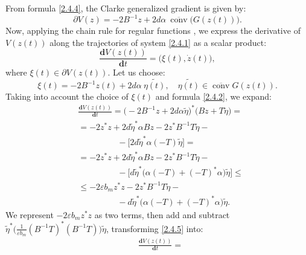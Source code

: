 \documentclass[journal]{IEEEtran}
\theoremstyle{myplain}
\begin{document}
\begin{IEEEproof}
From formula \eqref{2.4.4}, the Clarke generalized gradient \cite{p14} is given by:
\[
\partial V(z) = -2B^{-1}z + 2d\alpha~\overline{\operatorname{conv}}\big(G(z(t))\big).
\]
Now, applying the chain rule for regular functions \cite{ShevitzPaden1994}, we express the derivative of $V(z(t))$ along the trajectories of system \eqref{2.4.1} as a scalar product:
\[
\frac{\mathbf{d}V(z(t))}{\mathbf{d}t} = \big( \xi(t), \dot z(t) \big), \tag{a.e.}
\]
where $\xi(t) \in \partial V(z(t))$. Let us choose:
\[
\xi(t) = -2B^{-1}z(t)+2d\alpha~\widetilde{\eta(t)}, \quad \widetilde{\eta(t)} \in \overline{\operatorname{conv}}G(z(t)).
\]
Taking into account the choice of $\xi (t)$ and formula \eqref{2.4.2}, we expand:
\begin{equation}\label{2.4.5}
\begin{aligned} & \frac{\mathbf{d}V(z(t))}{\mathbf{d}t} = \big(-2B^{-1}z+2d\alpha \widetilde{\eta}\big)^{*}\big(Bz+T\widetilde{\eta}) =\\ 
& = -2z^{*}z+2d\widetilde{\eta}^{*}\alpha B z -  2z^{*}B^{-1}T\widetilde{\eta} - \\
&~~~~~~~~~~~~~~~~~~~~~- \big[2d \widetilde{\eta}^{*} \alpha (-T) \widetilde{\eta} \big]= \\
& = -2z^{*}z+2d\widetilde{\eta}^{*}\alpha B z - 2z^{*}B^{-1}T\widetilde{\eta} - \\
& ~~~~~~~~~~~~~~~~~~~~~- \big[ d \widetilde{\eta}^{*}\big(\alpha(-T)+(-T)^{*}\alpha\big) \widetilde{\eta}\big] \leqslant\\
& \leqslant -2\varepsilon b_m z^{*}z - 2z^{*}B^{-1}T\widetilde{\eta} -\\&~~~~~~~~~~~~~~~~~~~~~- d \widetilde{\eta}^{*}\big(\alpha(-T)+(-T)^{*}\alpha\big) \widetilde{\eta}.
\end{aligned}
\end{equation}
We represent $-2\varepsilon b_m z^{*}z$ as two terms, then add and subtract $\widetilde{\eta}^{*}\big(\frac{1}{\varepsilon b_m}(B^{-1}T)^{*}(B^{-1}T)\big)\widetilde{\eta}$, transforming \eqref{2.4.5} into:
\begin{equation*}\label{2.4.6}
\begin{aligned} 
&\frac{\mathbf{d}V(z(t))}{\mathbf{d}t}  =  \\

\end{aligned}
\end{equation*}
\end{IEEEproof}
\end{document}
